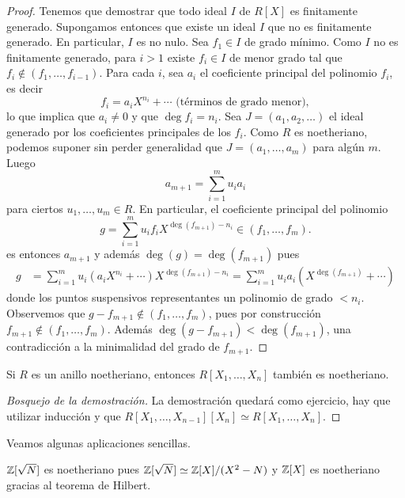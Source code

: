 \begin{proof}
	Tenemos que demostrar que todo ideal $I$ de $R[X]$ es finitamente generado. Supongamos
	entonces que existe un ideal $I$ que no es finitamente generado. En particular, 
	$I$ es no nulo. Sea $f_1\in I$ de grado mínimo. Como $I$ no es finitamente generado, para $i>1$ 
	existe $f_i\in I$ de menor grado 
	tal que $f_i\not\in (f_1,\dots,f_{i-1})$. 
	Para cada $i$, sea $a_i$ el coeficiente principal del polinomio $f_i$, es decir 
	\[
	f_i=a_iX^{n_i}+\cdots\text{ (términos de grado menor)}, 
	\]
    lo que implica que $a_i\ne 0$ y que $\deg f_i=n_i$.
	Sea $J=(a_1,a_2,\dots)$ el ideal generado por los coeficientes principales de los $f_i$.  
	Como $R$ es noetheriano, 
	podemos suponer sin perder generalidad que 
	$J=(a_1,\dots,a_m)$ para algún $m$. Luego
	\[
	a_{m+1}=\sum_{i=1}^m u_ia_i
	\]
	para ciertos $u_1,\dots,u_m\in R$. 
	En particular, el coeficiente principal del polinomio 
	\[
	g=\sum_{i=1}^m u_if_iX^{\deg(f_{m+1})-n_i}\in (f_1,\dots,f_m).
	\]
	es entonces $a_{m+1}$ y además $\deg(g)=\deg(f_{m+1})$ pues
	\begin{align*}
	g&=\sum_{i=1}^m u_i(a_iX^{n_i}+\cdots)X^{\deg(f_{m+1})-n_i}
	=\sum_{i=1}^m u_ia_i(X^{\deg(f_{m+1})}+\cdots)
\end{align*}
	donde los puntos suspensivos representantes un polinomio de grado $<n_i$. 
	Observemos que $g-f_{m+1}\not\in(f_1,\dots,f_m)$, pues por construcción $f_{m+1}\not\in (f_1,\dots,f_m)$. Además  $\deg(g-f_{m+1})<\deg(f_{m+1})$, una contradicción
	a la minimalidad del grado de $f_{m+1}$. 
\end{proof}

\begin{corollary}
	Si $R$ es un anillo noetheriano, entonces $R[X_1,\dots,X_n]$ también es noetheriano.
\end{corollary}

\begin{proof}[Bosquejo de la demostración]
La demostración quedará como ejercicio, hay que utilizar inducción y que $R[X_1,\dots,X_{n-1}][X_n]\simeq R[X_1,\dots,X_n]$.  	
\end{proof}

Veamos algunas aplicaciones sencillas.

\begin{example}
$\mathbb{Z}[\sqrt{N}]$ es noetheriano pues $\mathbb{Z}[\sqrt{N}]\simeq\mathbb{Z}[X]/(X^2-N)$ y $\mathbb{Z}[X]$ es noetheriano gracias al teorema de Hilbert.	
\end{example}

